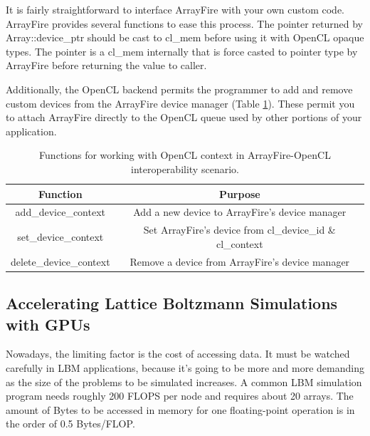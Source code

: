It is fairly straightforward to interface ArrayFire with your own custom code. ArrayFire provides several functions to ease this process. The pointer returned by Array::device_ptr should be cast to cl_mem before using it with OpenCL opaque types. The pointer is a cl_mem internally that is force casted to pointer type by ArrayFire before returning the value to caller.

Additionally, the OpenCL backend permits the programmer to add and remove custom devices from the ArrayFire device manager (Table \ref{table:afcl}). These permit you to attach ArrayFire directly to the OpenCL queue used by other portions of your application.

\begin{table}[h!]
	\centering
	\begin{tabular}{||c c||} 
		\hline
		Function & Purpose \\ [0.5ex] 
		\hline\hline
		add_device_context & Add a new device to ArrayFire's device manager \\ 
		set_device_context & Set ArrayFire's device from cl_device_id \& cl_context \\
		delete_device_context & Remove a device from ArrayFire's device manager \\
		\hline
	\end{tabular}
	\caption{Functions for working with OpenCL context in ArrayFire-OpenCL interoperability scenario.}
	\label{table:afcl}
\end{table}

\subsection{Accelerating Lattice Boltzmann Simulations with GPUs}



Nowadays, the limiting factor is the cost of accessing data. It must be watched carefully in LBM applications, because it's going to be more and more demanding as the size of the problems to be simulated increases. A common LBM simulation program needs roughly 200 FLOPS per node and requires about 20 arrays. The amount of Bytes to be accessed in memory for one floating-point operation is in the order of 0.5 Bytes/FLOP. 

